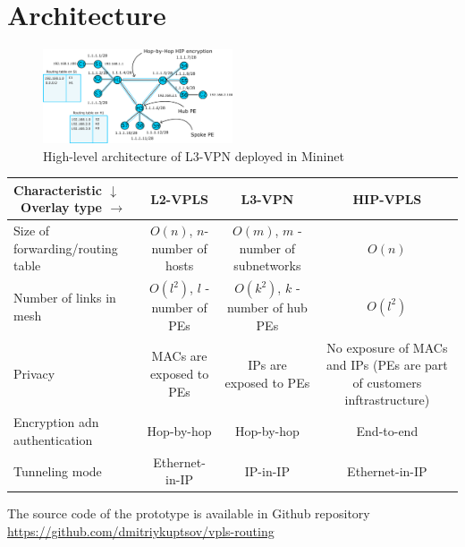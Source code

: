 \section{Architecture}
\label{section:architecture}


\begin{figure}[!h]
	\includegraphics[width=0.5\textwidth]{graphics/arch.png}
	\caption{High-level architecture of L3-VPN deployed in Mininet}
	\label{fig:arch}
\end{figure}

\begin{table}
        \begin{tabular}{|l|c|c|c|}
        \hline
        Characteristic $\downarrow$ \ Overlay type $\rightarrow$ & L2-VPLS & L3-VPN & HIP-VPLS \\\hline
        Size of forwarding/routing table & $O(n)$, $n$-number of hosts & $O(m)$, $m$ - number of subnetworks & $O(n)$\\\hline
        Number of links in mesh & $O(l^2)$, $l$ - number of PEs & $O(k^2)$, $k$ - number of hub PEs & $O(l^2)$ \\\hline
        Privacy & MACs are exposed to PEs & IPs are exposed to PEs & No exposure of MACs and IPs (PEs are part of customers inftrastructure) \\\hline
        Encryption adn authentication & Hop-by-hop & Hop-by-hop & End-to-end \\\hline
        Tunneling mode & Ethernet-in-IP & IP-in-IP & Ethernet-in-IP \\\hline
        \end{tabular}
        \label{tab:analysis}
\end{table}


The source code of the prototype is available in Github repository \url{https://github.com/dmitriykuptsov/vpls-routing}

~\cite{radiusmysql}
